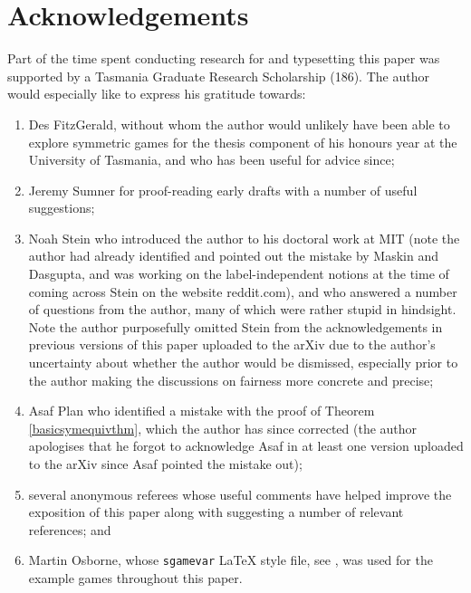 \documentclass[a4paper, 11pt]{article}
\theoremstyle{paper}
\begin{document}
    \section*{Acknowledgements}
    		Part of the time spent conducting research for and typesetting this paper was supported by a Tasmania Graduate Research Scholarship (186). The author would especially like to express his gratitude towards:
    		\begin{enumerate}
    			\item Des FitzGerald, without whom the author would unlikely have been able to explore symmetric games for the thesis component of his honours year at the University of Tasmania, and who has been useful for advice since;
	    		\item Jeremy Sumner for proof-reading early drafts with a number of useful suggestions;
	    		\item Noah Stein who introduced the author to his doctoral work at MIT (note the author had already identified and pointed out the mistake by Maskin and Dasgupta, and was working on the label-independent notions at the time of coming across Stein on the website reddit.com), and who answered a number of questions from the author, many of which were rather stupid in hindsight. Note the author purposefully omitted Stein from the acknowledgements in previous versions of this paper uploaded to the arXiv due to the author's uncertainty about whether the author would be dismissed, especially prior to the author making the discussions on fairness more concrete and precise;
	    		\item Asaf Plan who identified a mistake with the proof of Theorem \ref{basicsymequivthm}, which the author has since corrected (the author apologises that he forgot to acknowledge Asaf in at least one version uploaded to the arXiv since Asaf pointed the mistake out);
	    		\item several anonymous referees whose useful comments have helped improve the exposition of this paper along with suggesting a number of relevant references; and
	    		\item Martin Osborne, whose {\tt sgamevar} {\LaTeX} style file, see \cite{SGAMESTY}, was used for the example games throughout this paper.
    		\end{enumerate} 
    		
    
    \nocite{GAP4} 
    
    
\end{document}

